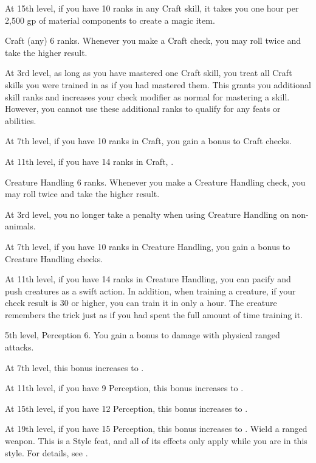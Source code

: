     At 15th level, if you have 10 ranks in any Craft skill, it takes you one hour per 2,500 gp of material components to create a magic item. %

    \featpre Craft (any) 6 ranks.
    \featben Whenever you make a Craft check, you may roll twice and take the higher result.

    At 3rd level, as long as you have mastered one Craft skill, you treat all Craft skills you were trained in as if you had mastered them.
    This grants you additional skill ranks and increases your check modifier as normal for mastering a skill.
    However, you cannot use these additional ranks to qualify for any feats or abilities.

    At 7th level, if you have 10 ranks in Craft, you gain a  bonus to Craft checks.

    At 11th level, if you have 14 ranks in Craft, \tdash.

    \featpre Creature Handling 6 ranks.
    \featben Whenever you make a Creature Handling check, you may roll twice and take the higher result.

    At 3rd level, you no longer take a penalty when using Creature Handling on non-animals.

    At 7th level, if you have 10 ranks in Creature Handling, you gain a  bonus to Creature Handling checks.

    At 11th level, if you have 14 ranks in Creature Handling, you can pacify and push creatures as a swift action.
    In addition, when training a creature, if your check result is 30 or higher, you can train it in only a hour.
    The creature remembers the trick just as if you had spent the full amount of time training it.

    \featpres 5th level, Perception 6.
    \featben You gain a  bonus to damage with physical ranged attacks.

    At 7th level, this bonus increases to .

    At 11th level, if you have 9 Perception, this bonus increases to .

    At 15th level, if you have 12 Perception, this bonus increases to .

    At 19th level, if you have 15 Perception, this bonus increases to .
    \stylereq Wield a ranged weapon.
     This is a Style feat, and all of its effects only apply while you are in this style.
    For details, see .

